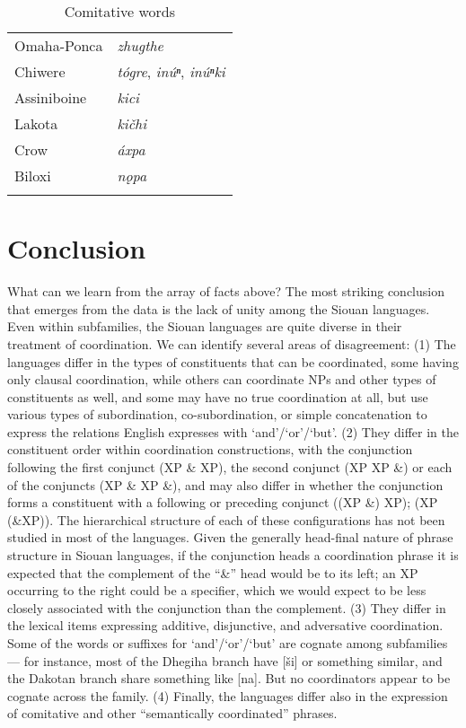 \documentclass[output=paper]{LSP/langsci}
\begin{document}
\begin{table}
\caption{Comitative words} \label{comitative} 

\begin{tabular} [t]{ l  l  }
\lsptoprule
Omaha-Ponca	& \textit{zhugthe} \\
Chiwere &  \textit{t\'ogre},  \textit{in\'uⁿ}, \textit{in\'uⁿki} \\
Assiniboine &  \textit{kici} \\
Lakota & \textit{ki\v{c}hi} \\
Crow & \textit{\'axpa} \\
Biloxi & \textit{n\k{o}pa} \\
\lspbottomrule
\end{tabular}
\end{table}

\section{Conclusion}
 
What can we learn from the array of facts above? The most striking conclusion that emerges from the data is the lack of unity among the Siouan languages. Even within subfamilies, the Siouan languages are quite diverse in their treatment of coordination. We can identify several areas of disagreement: (1) The languages differ in the types of constituents that can be coordinated, some having only clausal coordination, while others can coordinate NPs and other types of constituents as well, and some may have no true
coordination at all, but use various types of subordination, co-subordination, or simple concatenation to express the relations English expresses with `and'/`or'/`but'. (2) They differ in the constituent order within coordination constructions, with the conjunction following the first conjunct (XP \& XP), the second conjunct (XP XP \&) or each of the conjuncts (XP \& XP \&), and may also differ in whether the conjunction forms a constituent with a following or preceding conjunct ((XP \&) XP); (XP (\&XP)). The hierarchical structure of each of these configurations has not been studied in most of the languages. Given the generally head-final nature of phrase structure in Siouan languages, if the conjunction heads a coordination phrase it is expected that the complement of the ``\&'' head would be to its left; an XP occurring to the right could be a specifier, which we would expect to be less closely associated with the conjunction than the complement. (3) They differ in the lexical items expressing additive, disjunctive, and adversative coordination. Some of the words or suffixes for `and'/`or'/`but' are cognate among subfamilies --- for instance, most of the Dhegiha branch have [\v{s}i] or something similar, and the Dakotan branch share something like [na]. But no coordinators appear to be cognate across the family. (4) Finally, the languages differ also in the expression of comitative and other ``semantically coordinated'' phrases.
\end{document}
